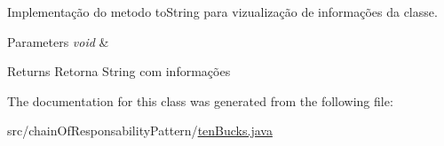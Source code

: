 Implementação do metodo to\+String para vizualização de informações da classe. 


\begin{DoxyParams}{Parameters}
{\em void} & \\
\hline
\end{DoxyParams}
\begin{DoxyReturn}{Returns}
Retorna String com informações 
\end{DoxyReturn}


The documentation for this class was generated from the following file\+:\begin{DoxyCompactItemize}
\item 
src/chain\+Of\+Responsability\+Pattern/\mbox{\hyperlink{ten_bucks_8java}{ten\+Bucks.\+java}}\end{DoxyCompactItemize}
